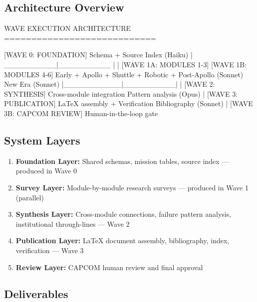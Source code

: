 \documentclass[11pt,letterpaper]{article}
\begin{document}
\subsection{Architecture Overview}

\begin{asciibox}
WAVE EXECUTION ARCHITECTURE
============================

        [WAVE 0: FOUNDATION]
        Schema + Source Index (Haiku)
              |
    __________|__________
   |                     |
[WAVE 1A: MODULES 1-3] [WAVE 1B: MODULES 4-6]
  Early + Apollo +        Shuttle + Robotic +
  Post-Apollo (Sonnet)    New Era (Sonnet)
   |___________|__________|
              |
        [WAVE 2: SYNTHESIS]
        Cross-module integration
        Pattern analysis (Opus)
              |
        [WAVE 3: PUBLICATION]
        LaTeX assembly + Verification
        Bibliography (Sonnet)
              |
        [WAVE 3B: CAPCOM REVIEW]
        Human-in-the-loop gate
\end{asciibox}

\subsection{System Layers}

\begin{enumerate}[leftmargin=*]
  \item \textbf{Foundation Layer:} Shared schemas, mission tables, source index --- produced in Wave 0
  \item \textbf{Survey Layer:} Module-by-module research surveys --- produced in Wave 1 (parallel)
  \item \textbf{Synthesis Layer:} Cross-module connections, failure pattern analysis, institutional through-lines --- Wave 2
  \item \textbf{Publication Layer:} LaTeX document assembly, bibliography, index, verification --- Wave 3
  \item \textbf{Review Layer:} CAPCOM human review and final approval
\end{enumerate}

\subsection{Deliverables}
\end{document}
